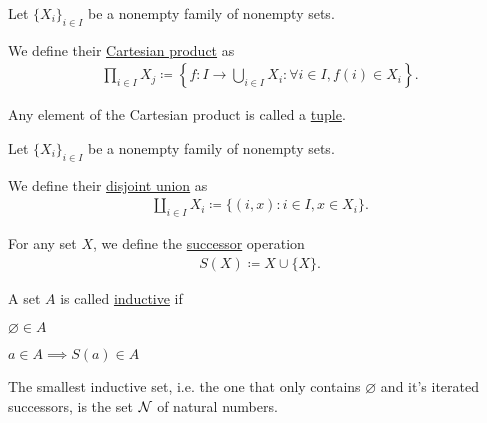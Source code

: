 \begin{definition}\label{def:cartessian_product}\cite[11]{Lectures:general_topology}
  Let $\{ X_i \}_{i \in I}$ be a nonempty family of nonempty sets.

  We define their \uline{Cartesian product} as
  \begin{align*}
    \prod_{i \in I} X_j \coloneqq \left\{ f: I \to \bigcup_{i \in I} X_i \colon \forall i \in I, f(i) \in X_i \right\}.
  \end{align*}

  Any element of the Cartesian product is called a \uline{tuple}.
\end{definition}

\begin{definition}\label{def:disjoint_union}
  Let $\{ X_i \}_{i \in I}$ be a nonempty family of nonempty sets.

  We define their \uline{disjoint union} as
  \begin{align*}
    \coprod_{i \in I} X_i \coloneqq \{ (i, x) \colon i \in I, x \in X_i \}.
  \end{align*}
\end{definition}

\begin{definition}\label{def:successor_operator}\cite[11]{Lectures:general_topology}
  For any set $X$, we define the \uline{successor} operation
  \begin{align*}
    S(X) \coloneqq X \cup \{ X \}.
  \end{align*}
\end{definition}

\begin{definition}\label{def:inductive_set}\cite[11]{Lectures:general_topology}
  A set $A$ is called \uline{inductive} if
  \begin{defenum}
    \item $\varnothing \in A$
    \item $a \in A \implies S(a) \in A$
  \end{defenum}
\end{definition}

\begin{example}\label{ex:natural_numbers_zfc}
  The smallest inductive set, i.e. the one that only contains $\varnothing$ and it's iterated successors, is the set $\mathcal N$ of natural numbers.
\end{example}

